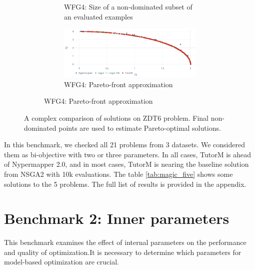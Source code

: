 \begin{figure}
\begin{subfigure}{\textwidth}
\begin{subfigure}{0.5\textwidth}
                \caption{WFG4: Size of a non-dominated subset of an evaluated examples}
                \label{fig:wfg4_ndf}
            \end{subfigure} 
            \begin{subfigure}{0.5\textwidth}
                \includegraphics[width=\textwidth]{content/images/wfg4_front}
                \caption{WFG4: Pareto-front approximation}
                \label{fig:wfg4_front}
            \end{subfigure}
        \end{subfigure} 
        \caption[Comparison of solutions on ZDT6 problem]{A complex comparison of solutions on ZDT6 problem. Final non-dominated points are used to estimate Pareto-optimal solutions.}
        \label{fig:wfg_14}    
    \end{figure}


    In this benchmark, we checked all 21 problems from 3 datasets. We considered them as bi-objective with two or three parameters. In all cases, TutorM is ahead of Nypermapper 2.0, and in most cases, TutorM is nearing the baseline solution from NSGA2 with 10k evaluations. The table \ref{tab:magic_five} shows some solutions to the 5 problems. The full list of results is provided in the appendix.
 
    

\section{Benchmark 2: Inner parameters}
    This benchmark examines the effect of internal parameters on the performance and quality of optimization.It is necessary to determine which parameters for model-based optimization are crucial.

